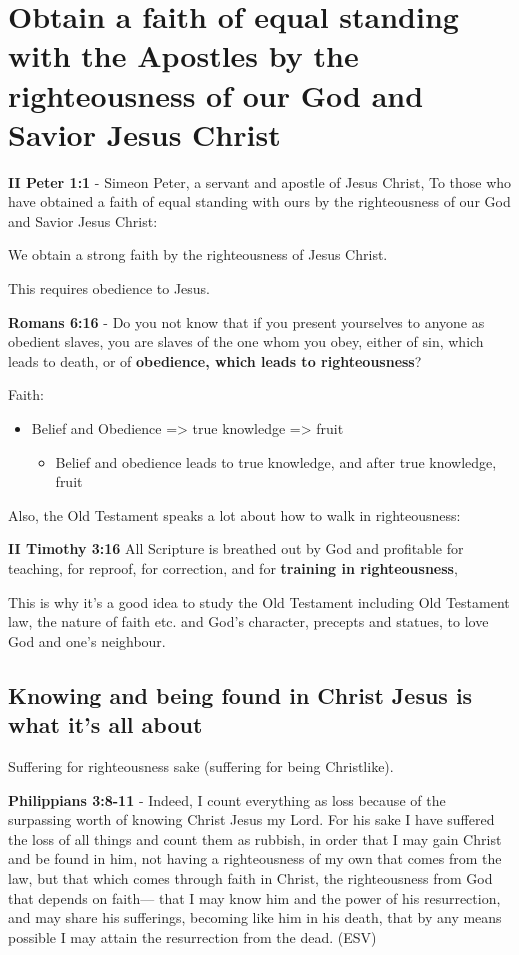 \documentclass[11pt]{article}
\begin{document}
\section{Obtain a faith of equal standing with the Apostles by the righteousness of our God and Savior Jesus Christ}
\label{sec:org6f39390}
\textbf{II Peter 1:1} - Simeon Peter, a servant and apostle of Jesus Christ, To those who have obtained a faith of equal standing with ours by the righteousness of our God and Savior Jesus Christ:

We obtain a strong faith by the righteousness of Jesus Christ.

This requires obedience to Jesus.

\textbf{Romans 6:16} - Do you not know that if you present yourselves to anyone as obedient slaves, you are slaves of the one whom you obey, either of sin, which leads to death, or of \textbf{obedience, which leads to righteousness}?

Faith:
\begin{itemize}
\item Belief and Obedience => true knowledge => fruit
\begin{itemize}
\item Belief and obedience leads to true knowledge, and after true knowledge, fruit
\end{itemize}
\end{itemize}

Also, the Old Testament speaks a lot about how to walk in righteousness:

\textbf{II Timothy 3:16} All Scripture is breathed out by God and profitable for teaching, for reproof, for correction, and for \textbf{training in righteousness},

This is why it's a good idea to study the Old Testament including Old Testament law, the nature of faith etc. and God's character, precepts and statues, to love God and one's neighbour.

\subsection{Knowing and being found in Christ Jesus is what it's all about}
\label{sec:org37e6031}
Suffering for righteousness sake (suffering for being Christlike).

\textbf{Philippians 3:8-11} - Indeed, I count everything as loss because of the surpassing worth of knowing Christ Jesus my Lord. For his sake I have suffered the loss of all things and count them as rubbish, in order that I may gain Christ and be found in him, not having a righteousness of my own that comes from the law, but that which comes through faith in Christ, the righteousness from God that depends on faith— that I may know him and the power of his resurrection, and may share his sufferings, becoming like him in his death, that by any means possible I may attain the resurrection from the dead. (ESV)
\end{document}
